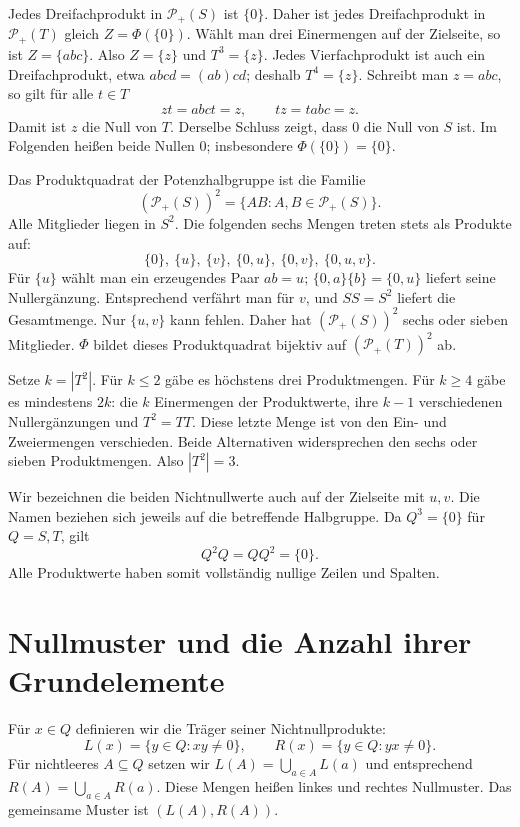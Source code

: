 \documentclass[a4paper,11pt]{article}
\newcommand{\Pp}[1]{\mathcal P_+(#1)}
\theoremstyle{remark}
\begin{document}
Jedes Dreifachprodukt in \(\Pp S\) ist \(\{0\}\). Daher ist
jedes Dreifachprodukt in \(\Pp T\) gleich
\(Z=\Phi(\{0\})\). Wählt man drei Einermengen auf der Zielseite,
so ist \(Z=\{abc\}\). Also \(Z=\{z\}\) und \(T^3=\{z\}\).
Jedes Vierfachprodukt ist auch ein Dreifachprodukt, etwa
\(abcd=(ab)cd\); deshalb \(T^4=\{z\}\). Schreibt man
\(z=abc\), so gilt für alle \(t\in T\)
\[
 zt=abct=z,\qquad tz=tabc=z.
\]
Damit ist \(z\) die Null von \(T\). Derselbe Schluss zeigt, dass
\(0\) die Null von \(S\) ist. Im Folgenden heißen beide Nullen
\(0\); insbesondere \(\Phi(\{0\})=\{0\}\).

Das Produktquadrat der Potenzhalbgruppe ist die Familie
\[
 (\Pp S)^2=\{AB:A,B\in\Pp S\}.
\]
Alle Mitglieder liegen in \(S^2\). Die folgenden sechs Mengen treten
stets als Produkte auf:
\[
 \{0\},\ \{u\},\ \{v\},\ \{0,u\},\ \{0,v\},\ \{0,u,v\}.
\]
Für \(\{u\}\) wählt man ein erzeugendes Paar \(ab=u\);
\(\{0,a\}\{b\}=\{0,u\}\) liefert seine Nullergänzung.
Entsprechend verfährt man für \(v\), und \(SS=S^2\) liefert die
Gesamtmenge. Nur \(\{u,v\}\) kann fehlen. Daher hat
\((\Pp S)^2\) sechs oder sieben Mitglieder. \(\Phi\) bildet dieses
Produktquadrat bijektiv auf \((\Pp T)^2\) ab.

Setze \(k=|T^2|\). Für \(k\le2\) gäbe es höchstens drei
Produktmengen. Für \(k\ge4\) gäbe es mindestens \(2k\): die
\(k\) Einermengen der Produktwerte, ihre \(k-1\) verschiedenen
Nullergänzungen und \(T^2=TT\). Diese letzte Menge ist von den
Ein- und Zweiermengen verschieden. Beide Alternativen widersprechen
den sechs oder sieben Produktmengen. Also \(|T^2|=3\).

Wir bezeichnen die beiden Nichtnullwerte auch auf der Zielseite mit
\(u,v\). Die Namen beziehen sich jeweils auf die betreffende
Halbgruppe. Da \(Q^3=\{0\}\) für \(Q=S,T\), gilt
\[
 Q^2Q=QQ^2=\{0\}.
\]
Alle Produktwerte haben somit vollständig nullige Zeilen und Spalten.

\section{Nullmuster und die Anzahl ihrer Grundelemente}

Für \(x\in Q\) definieren wir die Träger seiner Nichtnullprodukte:
\[
 L(x)=\{y\in Q:xy\ne0\},\qquad
 R(x)=\{y\in Q:yx\ne0\}.
\]
Für nichtleeres \(A\subseteq Q\) setzen wir
\(L(A)=\bigcup_{a\in A}L(a)\) und entsprechend
\(R(A)=\bigcup_{a\in A}R(a)\). Diese Mengen heißen linkes und
rechtes Nullmuster. Das gemeinsame Muster ist \((L(A),R(A))\).
\end{document}
